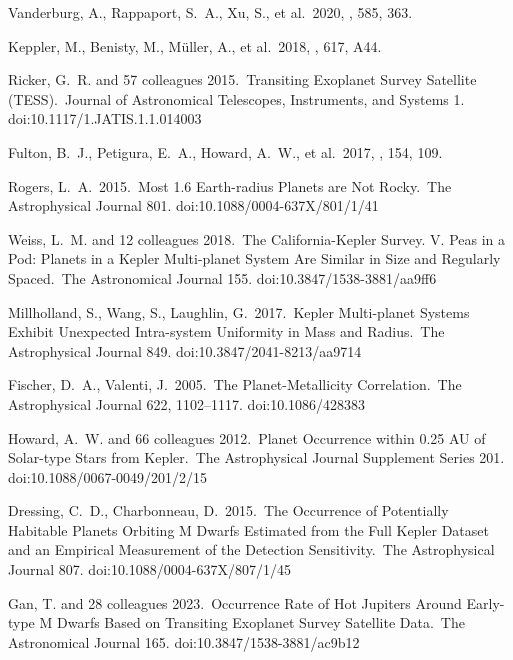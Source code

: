  Vanderburg, A., Rappaport, S.~A., Xu, S., et al.\ 2020, \nat, 585, 363.

 Keppler, M., Benisty, M., M{\"u}ller, A., et al.\ 2018, \aap, 617, A44.






 Ricker, G.~R. and 57 colleagues 2015.\ Transiting Exoplanet Survey Satellite (TESS).\ Journal of Astronomical Telescopes, Instruments, and Systems 1. doi:10.1117/1.JATIS.1.1.014003


 Fulton, B.~J., Petigura, E.~A., Howard, A.~W., et al.\ 2017, \aj, 154, 109.

 Rogers, L.~A.\ 2015.\ Most 1.6 Earth-radius Planets are Not Rocky.\ The Astrophysical Journal 801. doi:10.1088/0004-637X/801/1/41

 Weiss, L.~M. and 12 colleagues 2018.\ The California-Kepler Survey. V. Peas in a Pod: Planets in a Kepler Multi-planet System Are Similar in Size and Regularly Spaced.\ The Astronomical Journal 155. doi:10.3847/1538-3881/aa9ff6

 Millholland, S., Wang, S., Laughlin, G.\ 2017.\ Kepler Multi-planet Systems Exhibit Unexpected Intra-system Uniformity in Mass and Radius.\ The Astrophysical Journal 849. doi:10.3847/2041-8213/aa9714


 Fischer, D.~A., Valenti, J.\ 2005.\ The Planet-Metallicity Correlation.\ The Astrophysical Journal 622, 1102–1117. doi:10.1086/428383


 Howard, A.~W. and 66 colleagues 2012.\ Planet Occurrence within 0.25 AU of Solar-type Stars from Kepler.\ The Astrophysical Journal Supplement Series 201. doi:10.1088/0067-0049/201/2/15

 Dressing, C.~D., Charbonneau, D.\ 2015.\ The Occurrence of Potentially Habitable Planets Orbiting M Dwarfs Estimated from the Full Kepler Dataset and an Empirical Measurement of the Detection Sensitivity.\ The Astrophysical Journal 807. doi:10.1088/0004-637X/807/1/45


 Gan, T. and 28 colleagues 2023.\ Occurrence Rate of Hot Jupiters Around Early-type M Dwarfs Based on Transiting Exoplanet Survey Satellite Data.\ The Astronomical Journal 165. doi:10.3847/1538-3881/ac9b12

